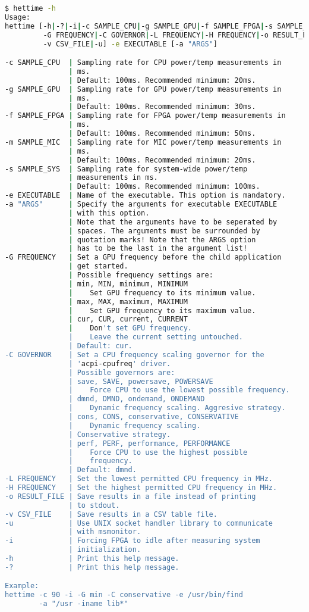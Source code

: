 \begin{lstlisting}[language=sh,basicstyle=\tiny,stringstyle=\color{black},keywordstyle=\color{black}]
$ hettime -h
Usage:
hettime [-h|-?|-i|-c SAMPLE_CPU|-g SAMPLE_GPU|-f SAMPLE_FPGA|-s SAMPLE_SYS|
         -G FREQUENCY|-C GOVERNOR|-L FREQUENCY|-H FREQUENCY|-o RESULT_FILE|
         -v CSV_FILE|-u] -e EXECUTABLE [-a "ARGS"]

-c SAMPLE_CPU  | Sampling rate for CPU power/temp measurements in 
			   | ms.
               | Default: 100ms. Recommended minimum: 20ms.
-g SAMPLE_GPU  | Sampling rate for GPU power/temp measurements in
			   | ms.
               | Default: 100ms. Recommended minimum: 30ms.
-f SAMPLE_FPGA | Sampling rate for FPGA power/temp measurements in
			   | ms.
               | Default: 100ms. Recommended minimum: 50ms.
-m SAMPLE_MIC  | Sampling rate for MIC power/temp measurements in
			   | ms.
               | Default: 100ms. Recommended minimum: 20ms.
-s SAMPLE_SYS  | Sampling rate for system-wide power/temp
			   | measurements in ms.
               | Default: 100ms. Recommended minimum: 100ms.
-e EXECUTABLE  | Name of the executable. This option is mandatory.
-a "ARGS"      | Specify the arguments for executable EXECUTABLE
			   | with this option.
               | Note that the arguments have to be seperated by
               | spaces. The arguments must be surrounded by
               | quotation marks! Note that the ARGS option
               | has to be the last in the argument list!
-G FREQUENCY   | Set a GPU frequency before the child application
			   | get started.
               | Possible frequency settings are:
               | min, MIN, minimum, MINIMUM
               |    Set GPU frequency to its minimum value.
               | max, MAX, maximum, MAXIMUM
               |    Set GPU frequency to its maximum value.
               | cur, CUR, current, CURRENT
               |    Don't set GPU frequency.
               |	Leave the current setting untouched.
               | Default: cur.
-C GOVERNOR    | Set a CPU frequency scaling governor for the
			   | 'acpi-cpufreq' driver.
               | Possible governors are:
               | save, SAVE, powersave, POWERSAVE
               |    Force CPU to use the lowest possible frequency.
               | dmnd, DMND, ondemand, ONDEMAND
               |    Dynamic frequency scaling. Aggresive strategy.
               | cons, CONS, conservative, CONSERVATIVE
               |    Dynamic frequency scaling.
               | Conservative strategy.
               | perf, PERF, performance, PERFORMANCE
               |    Force CPU to use the highest possible 
               | 	frequency.
               | Default: dmnd.
-L FREQUENCY   | Set the lowest permitted CPU frequency in MHz.
-H FREQUENCY   | Set the highest permitted CPU frequency in MHz.
-o RESULT_FILE | Save results in a file instead of printing
			   | to stdout.
-v CSV_FILE    | Save results in a CSV table file.
-u             | Use UNIX socket handler library to communicate
			   | with msmonitor.
-i             | Forcing FPGA to idle after measuring system
			   | initialization.
-h             | Print this help message.
-?             | Print this help message.

Example:
hettime -c 90 -i -G min -C conservative -e /usr/bin/find 
		-a "/usr -iname lib*"
\end{lstlisting}
